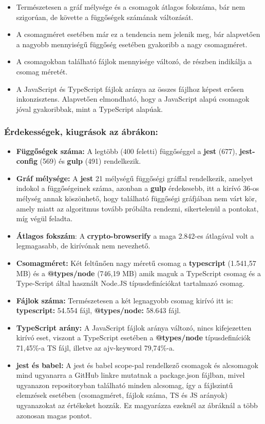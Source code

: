 \begin{itemize}
	\item Természetesen a gráf mélysége és a csomagok átlagos fokszáma, bár nem szigorúan, de követte a függőségek számának változását.
	\item A csomagméret esetében már ez a tendencia nem jelenik meg, bár alapvetően a nagyobb mennyiségű függőség esetében gyakoribb a nagy csomagméret.
	\item A csomagokban található fájlok mennyisége változó, de részben indikálja a csomag méretét.
	\item A JavaScript és TypeScript fájlok aránya az összes fájlhoz képest erősen inkonzisztens. Alapvetően elmondható, hogy a JavaScript alapú csomagok jóval gyakoribbak, mint a TypeScript alapúak.
\end{itemize}

\subsubsection{Érdekességek, kiugrások az ábrákon:}

\begin{itemize}
	\item \textbf{Függőségek száma:} A legtöbb (400 feletti) függőséggel a \textbf{jest} (677), \textbf{jest-config} (569) és \textbf{gulp} (491) rendelkezik.
	\item \textbf{Gráf mélysége:} A \textbf{jest} 21 mélységű függőségi gráffal rendelkezik, amelyet indokol a függőségeinek száma, azonban a \textbf{gulp} érdekesebb, itt a kirívó 36-os mélység annak köszönhető, hogy található függőségi gráfjában nem várt kör, amely miatt az algoritmus tovább próbálta rendezni, sikertelenül a pontokat, míg végül feladta.
	\item \textbf{Átlagos fokszám}:  A \textbf{crypto-browserify} a maga 2.842-es átlagával volt a legmagasabb, de kirívónak nem nevezhető.
	\item \textbf{Csomagméret:} Két feltűnően nagy méretű csomag a \textbf{typescript} (1.541,57 MB) és a \textbf{@types/node} (746,19 MB) amik maguk a TypeScript csomag és a Type-Script által használt Node.JS típusdefiníciókat tartalmazó csomag.
	\item \textbf{Fájlok száma:} Természetesen a két legnagyobb csomag kirívó itt is: \textbf{typescript:} 54.554 fájl, \textbf{@types/node:} 58.643 fájl.
	\item \textbf{TypeScript arány:} A JavaScript fájlok aránya változó, nincs kifejezetten kirívó eset, viszont a TypeScript esetében a \textbf{@types/node} típusdefiníciók 71,45\%-a TS fájl, illetve az ajv-keyword 79,74\%-a.
	\item \textbf{jest és babel: }A jest és babel scope-pal rendelkező csomagok és alcsomagok mind ugyanarra a GitHub linkre mutatnak a package.json fájlban, mivel ugyanazon repositoryban található minden alcsomag, így a fájlszintű elemzések esetében (csomagméret, fájlok száma, TS és JS arányok) ugyanazokat az értékeket hozzák. Ez magyarázza ezeknél az ábráknál a több azonosan magas pontot.
	
\end{itemize}


